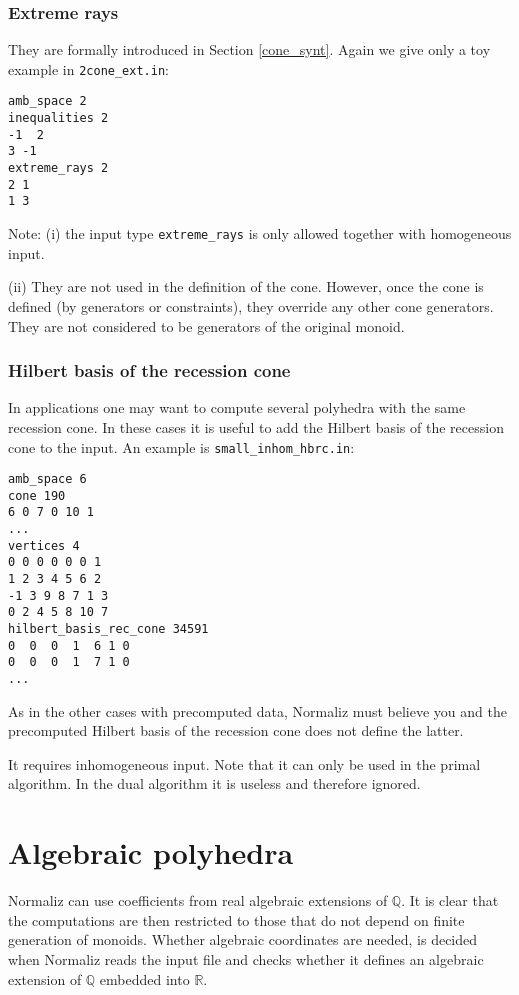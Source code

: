 \documentclass[12pt,a4paper]{scrartcl}
\theoremstyle{definition}
\def\QQ{{\mathbb Q}}
\def\RR{{\mathbb R}}
\begin{document}
{\subsubsection{Extreme rays} \label{extrays_ex}

They are formally introduced in Section \ref{cone_synt}. Again we give only a toy example in \verb|2cone_ext.in|:
\begin{Verbatim}
amb_space 2
inequalities 2
-1  2
3 -1
extreme_rays 2
2 1
1 3
\end{Verbatim}

Note: (i) the input type \verb|extreme_rays| is only allowed together with homogeneous input.

(ii) They are not used in the definition of the cone. However, once the cone is defined (by generators or constraints), they override any other cone generators. They are not considered to be generators of the original monoid.

\subsubsection{Hilbert basis of the recession cone}

In applications one may want to compute several polyhedra with the same recession cone. In these cases it is useful to add the Hilbert basis of the recession cone to the input. An example is \verb|small_inhom_hbrc.in|:
\begin{Verbatim}
amb_space 6
cone 190
6 0 7 0 10 1
...
vertices 4
0 0 0 0 0 0 1
1 2 3 4 5 6 2
-1 3 9 8 7 1 3
0 2 4 5 8 10 7
hilbert_basis_rec_cone 34591
0  0  0  1  6 1 0
0  0  0  1  7 1 0
...
\end{Verbatim}
As in the other cases with precomputed data, Normaliz must believe you and the precomputed Hilbert basis of the recession cone does not define the latter.

It requires inhomogeneous input. Note that it can only be used in the primal algorithm. In the dual algorithm it is useless and therefore ignored.  


\section{Algebraic polyhedra} \label{Algebraic}

Normaliz can use coefficients from real algebraic extensions of $\QQ$. It is clear that the computations are then restricted to those that do not depend on finite generation of monoids.  Whether algebraic coordinates are needed, is decided when Normaliz reads the input file and checks whether it defines an algebraic extension of $\QQ$ embedded into $\RR$.

}
\end{document}
